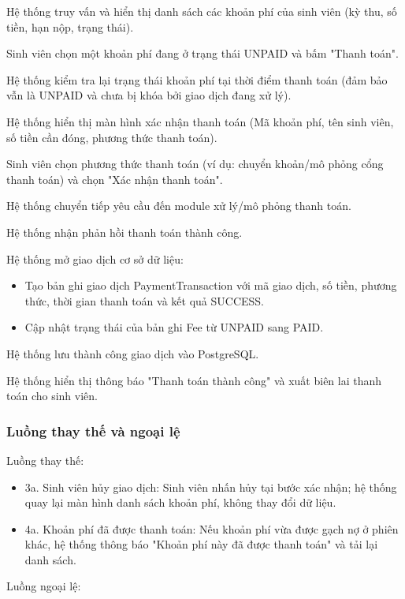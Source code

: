 Hệ thống truy vấn và hiển thị danh sách các khoản phí của sinh viên (kỳ thu, số tiền, hạn nộp, trạng thái).

Sinh viên chọn một khoản phí đang ở trạng thái UNPAID và bấm "Thanh toán".

Hệ thống kiểm tra lại trạng thái khoản phí tại thời điểm thanh toán (đảm bảo vẫn là UNPAID và chưa bị khóa bởi giao dịch đang xử lý).

Hệ thống hiển thị màn hình xác nhận thanh toán (Mã khoản phí, tên sinh viên, số tiền cần đóng, phương thức thanh toán).

Sinh viên chọn phương thức thanh toán (ví dụ: chuyển khoản/mô phỏng cổng thanh toán) và chọn "Xác nhận thanh toán".

Hệ thống chuyển tiếp yêu cầu đến module xử lý/mô phỏng thanh toán.

Hệ thống nhận phản hồi thanh toán thành công.

Hệ thống mở giao dịch cơ sở dữ liệu:

\begin{itemize}[leftmargin=1.4em]
\item Tạo bản ghi giao dịch PaymentTransaction với mã giao dịch, số tiền, phương thức, thời gian thanh toán và kết quả SUCCESS.
\item Cập nhật trạng thái của bản ghi Fee từ UNPAID sang PAID.
\end{itemize}

Hệ thống lưu thành công giao dịch vào PostgreSQL.

Hệ thống hiển thị thông báo "Thanh toán thành công" và xuất biên lai thanh toán cho sinh viên.

\subsubsection{Luồng thay thế và ngoại lệ}

Luồng thay thế:

\begin{itemize}[leftmargin=1.4em]
\item 3a. Sinh viên hủy giao dịch: Sinh viên nhấn hủy tại bước xác nhận; hệ thống quay lại màn hình danh sách khoản phí, không thay đổi dữ liệu.
\item 4a. Khoản phí đã được thanh toán: Nếu khoản phí vừa được gạch nợ ở phiên khác, hệ thống thông báo "Khoản phí này đã được thanh toán" và tải lại danh sách.
\end{itemize}

Luồng ngoại lệ:

